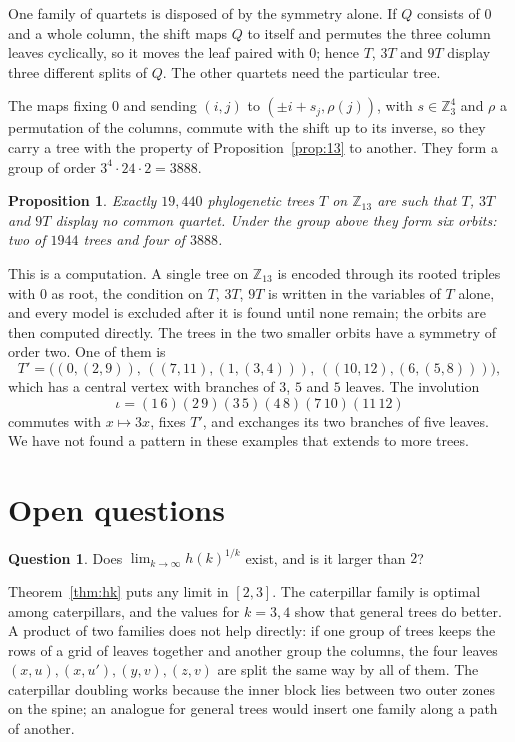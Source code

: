 \documentclass[11pt]{amsart}
\newtheorem{proposition}[theorem]{Proposition}
\theoremstyle{definition}
\newtheorem{question}[theorem]{Question}
\begin{document}
One family of quartets is disposed of by the symmetry alone. If $Q$ consists of $0$ and a whole column, the shift
maps $Q$ to itself and permutes the three column leaves cyclically, so it moves the leaf paired with $0$; hence $T$,
$3T$ and $9T$ display three different splits of $Q$. The other quartets need the particular tree.

The maps fixing $0$ and sending $(i,j)$ to $(\pm i+s_j,\rho(j))$, with $s\in\mathbb{Z}_3^4$ and $\rho$ a permutation of
the columns, commute with the shift up to its inverse, so they carry a tree with the property of
Proposition~\ref{prop:13} to another. They form a group of order $3^4\cdot24\cdot2=3888$.

\begin{proposition}\label{prop:classes}
Exactly $19{,}440$ phylogenetic trees $T$ on $\mathbb{Z}_{13}$ are such that $T$, $3T$ and $9T$ display no common
quartet. Under the group above they form six orbits: two of $1944$ trees and four of $3888$.
\end{proposition}

This is a computation. A single tree on $\mathbb{Z}_{13}$ is encoded through its rooted triples with $0$ as root, the
condition on $T$, $3T$, $9T$ is written in the variables of $T$ alone, and every model is excluded after it is found
until none remain; the orbits are then computed directly. The trees in the two smaller orbits have a symmetry of
order two. One of them is
\[
T'=\bigl((0,(2,9)),\,((7,11),(1,(3,4))),\,((10,12),(6,(5,8)))\bigr),
\]
which has a central vertex with branches of $3$, $5$ and $5$ leaves. The involution
\[
\iota=(1\,6)(2\,9)(3\,5)(4\,8)(7\,10)(11\,12)
\]
commutes with $x\mapsto3x$, fixes $T'$, and exchanges its two branches of five leaves. We have not found a pattern in these examples that extends to more trees.

\section{Open questions}\label{sec:open}

\begin{question}\label{q:limit}
Does $\lim_{k\to\infty} h(k)^{1/k}$ exist, and is it larger than $2$?
\end{question}

Theorem~\ref{thm:hk} puts any limit in $[2,3]$. The caterpillar family is optimal among caterpillars, and the
values for $k=3,4$ show that general trees do better. A product of two families does not help directly: if one group
of trees keeps the rows of a grid of leaves together and another group the columns, the four leaves $(x,u),(x,u'),
(y,v),(z,v)$ are split the same way by all of them. The caterpillar doubling works because the inner block lies
between two outer zones on the spine; an analogue for general trees would insert one family along a path of another.
\end{document}
